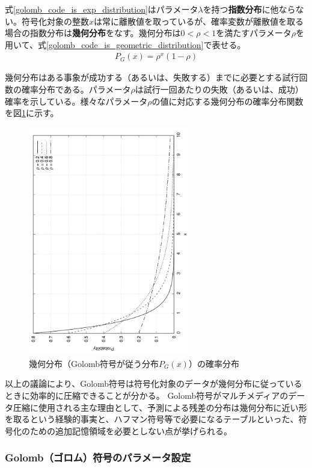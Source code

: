 \documentclass[uplatex,dvipdfmx,b5j,10pt]{jsbook}
\theoremstyle{definition}
\begin{document}
式\ref{golomb_code_is_exp_distribution}はパラメータ$\lambda$を持つ\textbf{指数分布}に他ならない。符号化対象の整数$x$は常に離散値を取っているが、確率変数が離散値を取る場合の指数分布は\textbf{幾何分布}をなす。幾何分布は$0 < \rho < 1$を満たすパラメータ$\rho$を用いて、式\ref{golomb_code_is_geometric_distribution}で表せる。
\begin{eqnarray}
  P_{G}(x) = \rho^{x} (1 - \rho) \label{golomb_code_is_geometric_distribution}
\end{eqnarray}

幾何分布はある事象が成功する（あるいは、失敗する）までに必要とする試行回数の確率分布である。パラメータ$\rho$は試行一回あたりの失敗（あるいは、成功）確率を示している。様々なパラメータ$\rho$の値に対応する幾何分布の確率分布関数を図\ref{golomb_code_dist}に示す。
\begin{figure}[htbp]
  \begin{center}
    \includegraphics[width=70mm, angle=-90]{./figs/geometric_dist.png}
  \end{center}
  \caption{幾何分布（Golomb符号が従う分布$P_{G}(x)$）の確率分布} \label{golomb_code_dist}
\end{figure}

以上の議論により、Golomb符号は符号化対象のデータが幾何分布に従っているときに効率的に圧縮できることが分かる。
Golomb符号がマルチメディアのデータ圧縮に使用される主な理由として、予測による残差の分布は幾何分布に近い形を取るという経験的事実と、ハフマン符号等で必要になるテーブルといった、符号化のための追加記憶領域を必要としない点が挙げられる。

\subsubsection{Golomb（ゴロム）符号のパラメータ設定}
\end{document}
